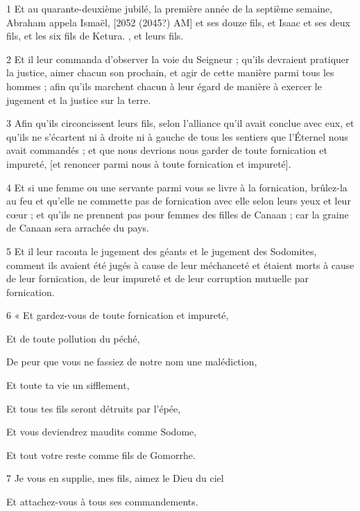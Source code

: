 \par 1 Et au quarante-deuxième jubilé, la première année de la septième semaine, Abraham appela Ismaël, [2052 (2045?) AM] et ses douze fils, et Isaac et ses deux fils, et les six fils de Ketura. , et leurs fils.
\par 2 Et il leur commanda d'observer la voie du Seigneur ; qu'ils devraient pratiquer la justice, aimer chacun son prochain, et agir de cette manière parmi tous les hommes ; afin qu'ils marchent chacun à leur égard de manière à exercer le jugement et la justice sur la terre.
\par 3 Afin qu'ils circoncissent leurs fils, selon l'alliance qu'il avait conclue avec eux, et qu'ils ne s'écartent ni à droite ni à gauche de tous les sentiers que l'Éternel nous avait commandés ; et que nous devrions nous garder de toute fornication et impureté, [et renoncer parmi nous à toute fornication et impureté].
\par 4 Et si une femme ou une servante parmi vous se livre à la fornication, brûlez-la au feu et qu'elle ne commette pas de fornication avec elle selon leurs yeux et leur cœur ; et qu'ils ne prennent pas pour femmes des filles de Canaan ; car la graine de Canaan sera arrachée du pays.
\par 5 Et il leur raconta le jugement des géants et le jugement des Sodomites, comment ils avaient été jugés à cause de leur méchanceté et étaient morts à cause de leur fornication, de leur impureté et de leur corruption mutuelle par fornication.
\par    
\par 6 « Et gardez-vous de toute fornication et impureté,  
\par     Et de toute pollution du péché,
\par    
\par     De peur que vous ne fassiez de notre nom une malédiction,  
\par     Et toute ta vie un sifflement,
\par    
\par     Et tous tes fils seront détruits par l'épée,  
\par     Et vous deviendrez maudits comme Sodome,  
\par     Et tout votre reste comme fils de Gomorrhe.
\par    
\par 7 Je vous en supplie, mes fils, aimez le Dieu du ciel  
\par     Et attachez-vous à tous ses commandements.
\par    
